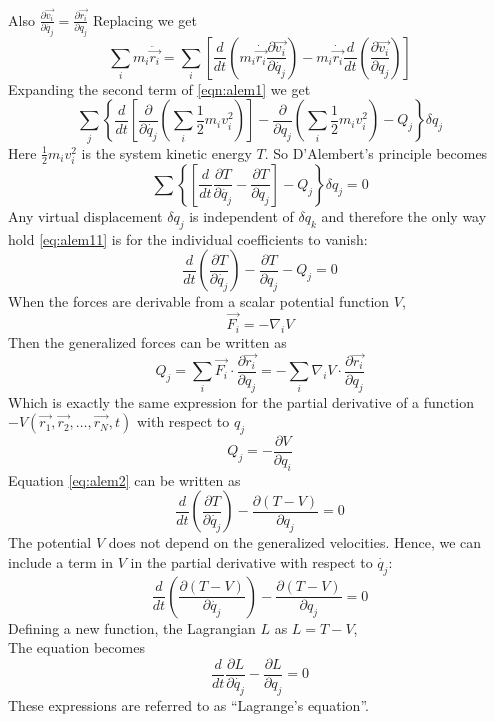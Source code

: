 \documentclass[12pt]{article}
\begin{document}
Also \(\frac{\partial \vec{v_i}}{\partial \dot{q_j}}=\frac{\partial \vec{r_i}}{\partial q_j}\) Replacing we get
\[
    \sum_i m_i\ddot{\vec{r_i}}=\sum_i\left[\frac{d}{dt}\left( m_i\dot{\vec{r_i}}\frac{\partial \vec{v_i}}{\partial \dot{q_j}} \right)-m_i\dot{\vec{r_i}}\frac{d}{dt}\left( \frac{\partial \vec{v_i}}{\partial q_j} \right)\right]
\]
Expanding the second term of \eqref{eqn:alem1} we get
\[
    \sum_j \left\{ \frac{d}{dt}\left[ \frac{\partial}{\partial \dot{q_j}}\left( \sum_i \frac{1}{2}m_iv_i^2 \right) \right]-\frac{\partial}{\partial q_j}\left( \sum_i \frac{1}{2}m_iv_i^2 \right)-Q_j \right\}\delta q_j
\]
Here \(\frac{1}{2} m_iv_i^2\) is the system kinetic energy \(T\). So D'Alembert's principle becomes 
\begin{equation}
    \sum \left\{ \left[ \frac{d}{dt}\frac{\partial T}{\partial \dot{q_j}}-\frac{\partial T}{\partial q_j} \right]-Q_j \right\}\delta q_j=0
    \label{eq:alem11}
\end{equation}
Any virtual displacement \(\delta q_j\) is independent of \(\delta q_k\) and therefore the only way hold \eqref{eq:alem11} is for the individual coefficients to vanish:
\begin{equation}
    \frac{d}{dt} \left(\frac{\partial T}{\partial \dot{q_j}}\right)-\frac{\partial T}{\partial q_j} -Q_j =0
    \label{eq:alem2}
\end{equation}
When the forces are derivable from a scalar potential function \(V\),
\[
    \vec{F_i}=-\nabla_i V
\]
Then the generalized forces can be written as 
\[
    Q_j=\sum_i \vec{F_i}\cdot\frac{\partial \vec{r_i}}{\partial q_j}=-\sum_i \nabla_i V\cdot\frac{\partial \vec{r_i}}{\partial q_j}
\]
Which is exactly the same expression for the partial derivative of a function \(-V(\vec{r_1},\vec{r_2},\dots,\vec{r_N},t)\) with respect to \(q_j\)
\[
    Q_j=-\frac{\partial V}{\partial q_i}
\]
Equation \eqref{eq:alem2} can be written as 
\[
    \frac{d}{dt}\left( \frac{\partial T}{\partial \dot{q_j}} \right)-\frac{\partial (T-V)}{\partial q_j}=0
\]
The potential \(V\) does not depend on the generalized velocities. Hence, we can include a term in \(V\) in the partial derivative with respect to \(\dot{q_j}\):
\[
    \frac{d}{dt}\left( \frac{\partial (T-V)}{\partial \dot{q_j}} \right)-\frac{\partial (T-V)}{\partial q_j}=0
\]
Defining a new function, the Lagrangian \(L\) as \(L=T-V\),\\
The equation becomes
\[
    \frac{d}{dt}\frac{\partial L}{\partial \dot{q_j}}-\frac{\partial L}{\partial q_j}=0
\]
These expressions are referred to as ``Lagrange's equation''.
\end{document}
